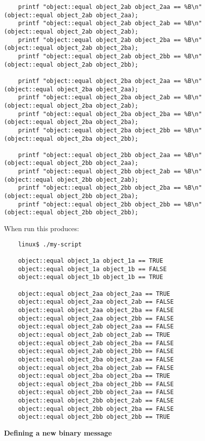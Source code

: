 \begin{verbatim}
    printf "object::equal object_2ab object_2aa == %B\n" (object::equal object_2ab object_2aa);
    printf "object::equal object_2ab object_2ab == %B\n" (object::equal object_2ab object_2ab);
    printf "object::equal object_2ab object_2ba == %B\n" (object::equal object_2ab object_2ba);
    printf "object::equal object_2ab object_2bb == %B\n" (object::equal object_2ab object_2bb);

    printf "object::equal object_2ba object_2aa == %B\n" (object::equal object_2ba object_2aa);
    printf "object::equal object_2ba object_2ab == %B\n" (object::equal object_2ba object_2ab);
    printf "object::equal object_2ba object_2ba == %B\n" (object::equal object_2ba object_2ba);
    printf "object::equal object_2ba object_2bb == %B\n" (object::equal object_2ba object_2bb);

    printf "object::equal object_2bb object_2aa == %B\n" (object::equal object_2bb object_2aa);
    printf "object::equal object_2bb object_2ab == %B\n" (object::equal object_2bb object_2ab);
    printf "object::equal object_2bb object_2ba == %B\n" (object::equal object_2bb object_2ba);
    printf "object::equal object_2bb object_2bb == %B\n" (object::equal object_2bb object_2bb);
\end{verbatim}

When run this produces:

\begin{verbatim}
    linux$ ./my-script

    object::equal object_1a object_1a == TRUE
    object::equal object_1a object_1b == FALSE
    object::equal object_1b object_1b == TRUE

    object::equal object_2aa object_2aa == TRUE
    object::equal object_2aa object_2ab == FALSE
    object::equal object_2aa object_2ba == FALSE
    object::equal object_2aa object_2bb == FALSE
    object::equal object_2ab object_2aa == FALSE
    object::equal object_2ab object_2ab == TRUE
    object::equal object_2ab object_2ba == FALSE
    object::equal object_2ab object_2bb == FALSE
    object::equal object_2ba object_2aa == FALSE
    object::equal object_2ba object_2ab == FALSE
    object::equal object_2ba object_2ba == TRUE
    object::equal object_2ba object_2bb == FALSE
    object::equal object_2bb object_2aa == FALSE
    object::equal object_2bb object_2ab == FALSE
    object::equal object_2bb object_2ba == FALSE
    object::equal object_2bb object_2bb == TRUE
\end{verbatim}

{\bf Defining a new binary message}

